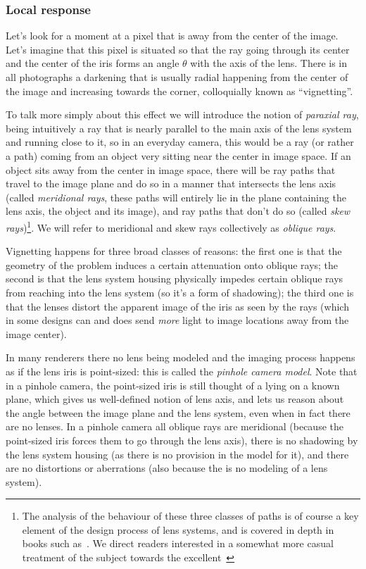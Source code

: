 \subsubsection{Local response}
Let's look for a moment at a pixel that is away from the center of the image.
Let's imagine that this pixel is situated so that the ray going through its center
and the center of the iris forms an angle $\theta$ with the axis of the lens.
There is in all photographs a darkening that is usually radial happening from the
center of the image and increasing towards the corner, colloquially known as ``vignetting''.

To talk more simply about this effect we will introduce the notion of \textsl{\gls{paraxial ray}},
being intuitively a ray that is nearly parallel to the main axis of the lens system and running 
close to it, so in an everyday camera, this would be a ray (or rather a path) coming from an 
object very sitting near the center in image space. 
If an object sits away from the center in image space, there will be ray paths that travel to the 
image plane and do so in a manner that intersects the lens axis (called \textsl{meridional rays}, 
these paths will entirely lie in the plane containing the lens axis, the object and its image),
and ray paths that don't do so (called \textsl{skew rays})\footnote{ 
	The analysis of the behaviour of these three classes of paths is of course a key element of 
	the design process of lens systems, and is covered in depth in books such 	
	as~\cite{kingslake2010,smith2008}. We direct readers interested in a somewhat more
	casual treatment of the subject towards the excellent~\cite{kingslake92}}.
We will refer to meridional and skew rays collectively as \textsl{\glspl{oblique ray}}.

Vignetting happens for three broad classes of reasons: 
	the first one is that the geometry of the problem induces a certain attenuation onto \glspl{oblique ray}; 
	the second is that the lens system housing physically impedes certain \glspl{oblique ray} from 
	reaching into the lens system (so it's a form of shadowing);
	the third one is that the lenses distort the apparent image of the \gls{iris} as seen by the
	rays (which in some designs can and does send \emph{more} light to image locations away from the
	image center).

In many renderers there no lens being modeled and the imaging process happens as if the
lens \gls{iris} is point-sized: this is called the \textsl{\gls{pinhole camera} model}.
Note that in a pinhole camera, the point-sized iris is still thought of a lying on a known plane,
which gives us well-defined notion of lens axis, and lets us reason about the angle between the
image plane and the lens system, even when in fact there are no lenses.
In a pinhole camera all oblique rays are meridional (because the point-sized iris forces
them to go through the lens axis), there is no shadowing by the lens system housing (as there
is no provision in the model for it), and there are no distortions or aberrations (also because
the is no modeling of a lens system).

